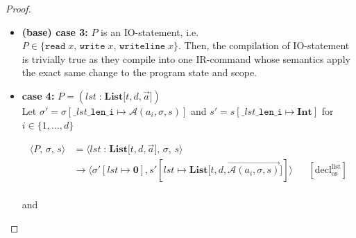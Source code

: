 \documentclass{article}
\begin{document}
\begin{proof}
\begin{itemize}
    \[
      \begin{aligned}
      \langle P,\, \sigma,\, s \rangle
      &=\langle \texttt{pass},\, \sigma,\, s \rangle \\
      &\rightarrow \langle \sigma ,\, s \rangle
      && [ \text{pass}_{\text{os}} ] \\   
      \end{aligned}
  \]
  
  and

  \[
      \begin{aligned}
      \langle \mathcal{C}(P),\, e,\, \sigma,\, s,\, pc \rangle
      &= \langle \mathcal{C}(\texttt{pass}),\, e,\, \sigma,\, s,\, pc \rangle \\
      &= \langle \texttt{NOOP},\, e,\, \sigma,\, s,\, pc \rangle
      && \text{(definition of $\mathcal{C}$)} \\   
      &= \langle \epsilon,\, e,\, \sigma ,\, s,\, pc+1 \rangle
      && \text{(operational semantics)} \\ 
      \end{aligned}
  \]

    \item \textbf{(base) case 3:} $P$ is an IO-statement, i.e. $P \in \{\texttt{read}\;x ,\, \texttt{write}\;x ,\, \texttt{writeline}\; x \}$. Then, the compilation of IO-statement is trivially true as they compile into one IR-command whose semantics apply the exact same change to the program state and scope.

    \item \textbf{case 4:} $P = (lst \;\texttt{:}\; \textbf{List[$t, d, \vec{a}$]})$\\

    Let $\sigma' = \sigma[\texttt{\_$lst$\_len\_i} \mapsto \mathcal{A}(a_i, \sigma, s)]$ and $s' = s[\texttt{\_$lst$\_len\_i} \mapsto \textbf{Int}]$ for $ i \in \{1,\dots,d\}$ 

        \[
          \begin{aligned}
          \langle P,\, \sigma,\, s \rangle
          &=\langle lst \;\texttt{:}\; \textbf{List[$t, d, \vec{a}$]},\, \sigma,\, s \rangle \\
          &\rightarrow \langle \sigma'[lst \mapsto \textbf{0}], s'[lst \mapsto \textbf{List[$t, d, \vec{\mathcal{A}(a_i, \sigma, s)}$]}] \rangle
          && [ \text{decl}^\text{list}_{\text{os}} ]\\   
          \end{aligned}
      \]
    
      and


\end{itemize}
\end{proof}
\end{document}
